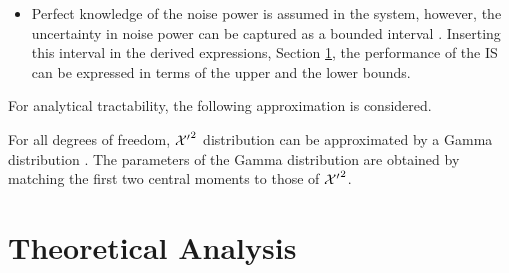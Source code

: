 \begin{itemize}
\item Perfect knowledge of the noise power is assumed in the system, however, the uncertainty in noise power can be captured as a bounded interval \cite{Tan08}. Inserting this interval in the derived expressions,  Section \ref{sec_IS:ana}, the performance of the IS can be expressed in terms of the upper and the lower bounds. 
\end{itemize}
For analytical tractability, the following approximation is considered.
\begin{approxi} \label{ap:ap1}
\normalfont
For all degrees of freedom, $\ncchi2$ distribution can be approximated by a Gamma distribution \cite{abramo}. The parameters of the Gamma distribution are obtained by matching the first two central moments to those of $\ncchi2$.
\end{approxi}


\section{Theoretical Analysis} \label{sec_IS:ana}
